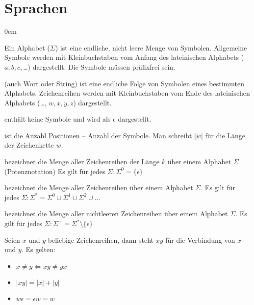 \section{Sprachen}
\begin{description}\itemsep0em

\item [Alphabete]
Ein Alphabet ($\Sigma$) ist eine endliche, nicht leere Menge von Symbolen.
Allgemeine Symbole werden mit Kleinbuchstaben vom Anfang des lateinischen Alphabets ($a, b, c, $\dots) dargestellt.
Die Symbole müssen präfixfrei sein.

\item [Zeichenreihe, -kette] 
(auch Wort oder String) ist eine endliche Folge von Symbolen eines bestimmten Alphabets.
Zeichenreihen werden mit Kleinbuchstaben vom Ende des lateinischen Alphabets (\dots, $w, x, y, z$) dargestellt.

\item [Leere Zeichenreihe] 
enthält keine Symbole und wird als $\epsilon$ dargestellt.

\item [Länge einer Zeichenreihe] 
ist die Anzahl Positionen -- Anzahl der Symbole. Man schreibt $|w|$ für die Länge der Zeichenkette $w$.

\item [$\Sigma^k$] 
bezeichnet die Menge aller Zeichenreihen der Länge $k$ über einem Alphabet $\Sigma$ (Potenznotation)
Es gilt für jedes $\Sigma: \Sigma^0 = \{\epsilon\}$

\item [$\Sigma^*$] 
bezeichnet die Menge aller Zeichenreihen über einem Alphabet $\Sigma$.
Es gilt für jedes $\Sigma: \Sigma^* = \Sigma^0 \cup \Sigma^1 \cup \Sigma^2 \cup \dots$

\item [$\Sigma^+$]
bezeichnet die Menge aller nichtleeren Zeichenreihen über einem Alphabet $\Sigma$.
Es gilt für jedes $\Sigma: \Sigma^+ = \Sigma^* \setminus \{\epsilon\}$

\item [Konkatenation] 
Seien $x$ und $y$ beliebige Zeichenreihen, dann steht $xy$ für die
Verbindung von $x$ und $y$. Es gelten:
\begin{itemize}\itemsep0em
	\item $x \neq y \Leftrightarrow xy \neq yx$
	\item $|xy| = |x| + |y|$
	\item $w\epsilon = \epsilon w = w$
\end{itemize}


\end{description}
